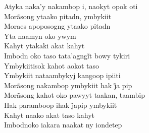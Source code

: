 \begin{linenumbers}

\noindent   Atyka naka'y nakambop i, naokyt opok oti\\
  Morãsong ytaako pitadn, ymbykiit\\
  Moraes apoposogng ytaako pitadn\\
  Yta naamyn oko ywym\\
  Kahyt ytakaki akat kahyt\\
  Imbodn oko taso tata’agngĩt bowy tykiri\\
  Ymbykiitisok kahot aokot taso\\
  Ymbykiit nataambykyj kangoop ipiiti\\
  Morãsong nakambop ymbykiit hak j̃a pip\\
  Morãsong kahot oko pawyyt taakan, taambip\\
  Hak paramboop ihak j̃apip ymbykiit\\
  Kahyt naako akat taso kahyt\\
  Imbodnoko iakara naakat ny iondetep
\end{linenumbers}



